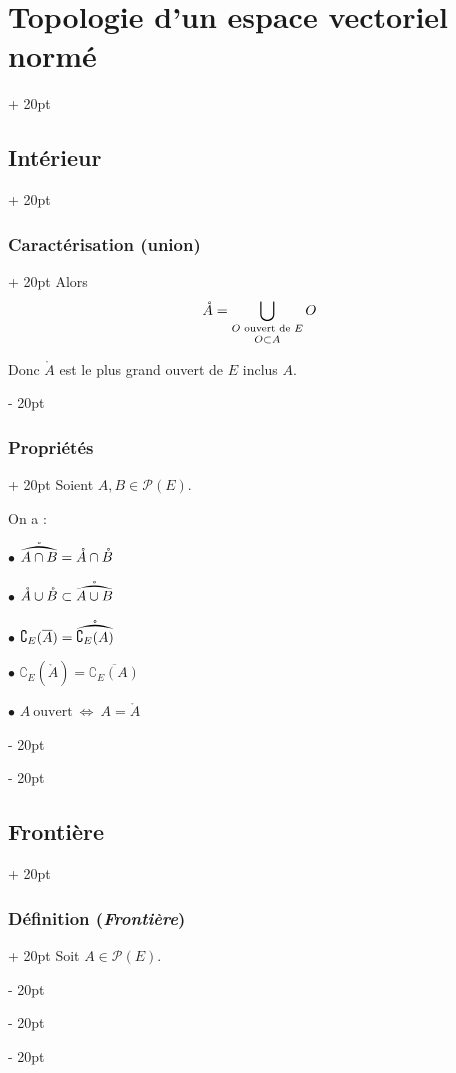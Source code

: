 \documentclass[a4paper, 12pt, twoside]{article}
\newcommand{\cj}[1]{\overline{#1}} %
\newcommand{\lr}[1]{\left( #1 \right)}
\newcommand{\ssi}{\ \Leftrightarrow \ }
\newcommand{\ind}[1][20pt]{\advance\leftskip + #1}
\newcommand{\deind}[1][20pt]{\advance\leftskip - #1}
\newenvironment{indt}[2][20pt]{#2 \par \ind[#1]}{\par \deind} %
\begin{document}
\begin{indt}{\section{Topologie d'un espace vectoriel normé}}
\begin{indt}{\subsection{Intérieur}}
\begin{indt}{\subsubsection{Caractérisation (union)}}
                Alors
                \[
                    \mathring A =
                    \bigcup_{\substack{O \text{ ouvert de } E \vspace{2pt} \\ O \subset A}} O
                \]

                Donc $\mathring A$ est le plus grand ouvert de $E$ inclus $A$.
            \end{indt}

            \vspace{12pt}
            
            \begin{indt}{\subsubsection{Propriétés}}
                Soient $A, B \in \mathcal P(E)$.

                On a :

                \vspace{6pt}
                
                $\bullet$ $\widering{A \cap B} = \mathring A \cap \mathring B$

                $\bullet$ $\mathring A \cup \mathring B \subset \widering{A \cup B}$

                $\bullet$ $\complement_E(\cj A) = \widering{\complement_E(A)}$

                $\bullet$ $\complement_E\!\lr{\mathring A} = \cj{\complement_E(A)}$

                \vspace{6pt}
                
                $\bullet$ $A\ \text{ouvert} \ssi A = \mathring A$
            \end{indt}
        \end{indt}

        \vspace{12pt}
        
        \begin{indt}{\subsection{Frontière}}
            \begin{indt}{\subsubsection{Définition (\textit{Frontière})}}
                Soit $A \in \mathcal P(E)$.


\end{indt}
\end{indt}
\end{indt}
\end{document}
